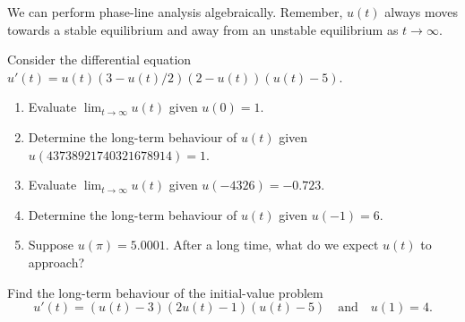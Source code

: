 \documentclass[../main.tex]{subfiles}
\begin{document}
\clearpage
We can perform phase-line analysis algebraically. \faPencil*{} Remember, \(u(t)\) always moves towards a stable equilibrium and away from an unstable equilibrium as \(t \to \infty\).

\begin{example}
  Consider the differential equation \(u'(t) = u(t)  (3 - u(t)/2) ( 2 - u(t) )(u(t) -5)\). 
  \begin{enumerate}[wide]
    \item Evaluate \(\lim_{t \to \infty} u(t)\) given \(u(0) = 1\).  
    \item Determine the long-term behaviour of \(u(t)\) given \(u(43738921740321678914) = 1\).  
    \item Evaluate \(\lim_{t \to \infty} u(t)\) given \(u(-4326) = -0.723\).  
    \item Determine the long-term behaviour of \(u(t)\) given \(u(-1) = 6\).  
    \item Suppose \(u(\pi) = 5.0001\). After a long time, what do we expect \(u(t)\) to approach?
  \end{enumerate}
\end{example}


%
%

\clearpage


\begin{example}
  Find the long-term behaviour of the initial-value problem 
  \[
    u'(t) = (u(t) - 3) (2u(t) - 1) (u(t) - 5) \quad\text{and}\quad u(1) = 4.
  \]
\end{example}
\end{document}
